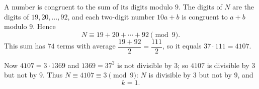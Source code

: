 A number is congruent to the sum of its digits modulo $9$. The digits of $N$ are the digits of $19,20,\dots,92$, and each two-digit number $10a+b$ is congruent to $a+b$ modulo $9$. Hence
\[N\equiv 19+20+\cdots+92\pmod 9.\]
This sum has $74$ terms with average $\dfrac{19+92}{2}=\dfrac{111}{2}$, so it equals $37\cdot111=4107$.

Now $4107=3\cdot1369$ and $1369=37^2$ is not divisible by $3$; so $4107$ is divisible by $3$ but not by $9$. Thus $N\equiv4107\equiv3\pmod 9$: $N$ is divisible by $3$ but not by $9$, and
\[k=\boxed{1}.\]
